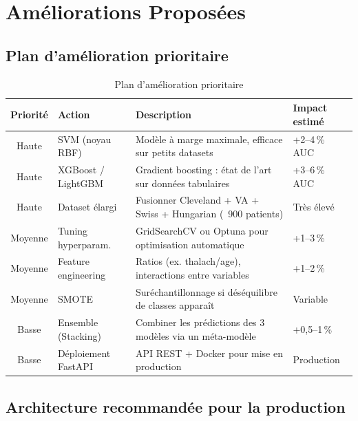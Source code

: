 \documentclass[12pt,a4paper]{article}
\begin{document}
	\section{Améliorations Proposées}
	
		\subsection{Plan d'amélioration prioritaire}
		
			\begin{table}[H]
				\centering
				\caption{Plan d'amélioration prioritaire}
				\label{tab:improvements}
				\begin{tabularx}{\textwidth}{clXl}
					\toprule
					\textbf{Priorité} & \textbf{Action} & \textbf{Description} & \textbf{Impact estimé} \\
					\midrule
					Haute & SVM (noyau RBF)          & Modèle à marge maximale, efficace sur petits datasets & +2–4\,\% AUC \\
					Haute & XGBoost / LightGBM       & Gradient boosting : état de l'art sur données tabulaires & +3–6\,\% AUC \\
					Haute & Dataset élargi           & Fusionner Cleveland + VA + Swiss + Hungarian (~900 patients) & Très élevé \\
					Moyenne & Tuning hyperparam.     & GridSearchCV ou Optuna pour optimisation automatique & +1–3\,\% \\
					Moyenne & Feature engineering    & Ratios (ex. thalach/age), interactions entre variables & +1–2\,\% \\
					Moyenne & SMOTE                  & Suréchantillonnage si déséquilibre de classes apparaît & Variable \\
					Basse & Ensemble (Stacking)      & Combiner les prédictions des 3 modèles via un méta-modèle & +0{,}5–1\,\% \\
					Basse & Déploiement FastAPI       & API REST + Docker pour mise en production & Production \\
					\bottomrule
				\end{tabularx}
			\end{table}
		\subsection{Architecture recommandée pour la production}
		
\end{document}
